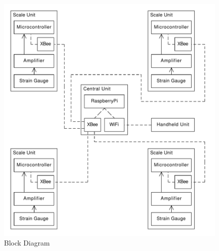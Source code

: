 \begin{figure}
\begin{center}
\includegraphics[width=12cm]{figures/block_diagram}
\end{center}
\caption{Block Diagram}
\label{fig:Block Diagram}
\end{figure}
